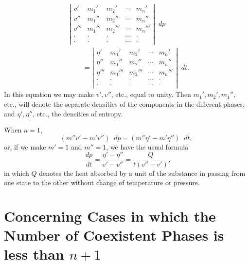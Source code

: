 \documentclass[11pt]{article}
\newcommand{\dd}{\mathop{}\!d}
\begin{document}
\begin{equation}
\begin{aligned}
&\left|\begin{array}{ccccc}
v'&m_1'&m_2'&\cdots&m_n'\\
v''&m_1''&m_2''&\cdots&m_n''\\
v'''&m_1'''&m_2'''&\cdots&m_n'''\\
\cdot&\cdot&\cdot&\cdots&\cdot\\
\cdot&\cdot&\cdot&\cdots&\cdot
\end{array}\right|\dd p \\
&\qquad =\left|\begin{array}{ccccc}
\eta'&m_1'&m_2'&\cdots&m_n'\\
\eta''&m_1''&m_2''&\cdots&m_n''\\
\eta'''&m_1'''&m_2'''&\cdots&m_n'''\\
\cdot&\cdot&\cdot&\cdots&\cdot\\
\cdot&\cdot&\cdot&\cdots&\cdot
\end{array}\right|\dd t.
\end{aligned}
\end{equation}
In this equation we may make \(v',v''\), etc., equal to unity. Then \(m_1',m_2',m_1''\), etc., will denote the separate densities of the components in the different phases, and \(\eta',\eta''\), etc., the densities of entropy.

When \(n=1\),
\begin{equation}
(m''v'-m'v'')\dd p=(m''\eta'-m'\eta'')\dd t,
\end{equation}
or, if we make \(m'=1\) and \(m''=1\), we have the usual formula
\begin{equation}
\frac{\dd p}{\dd t}=\frac{\eta'-\eta''}{v'-v''}=\frac{Q}{t(v''-v')},
\end{equation}
in which \(Q\) denotes the heat absorbed by a unit of the substance in passing from one state to the other without change of temperature or pressure.

\section*{Concerning Cases in which the Number of Coexistent Phases is less than \(n+1\)}
\end{document}

